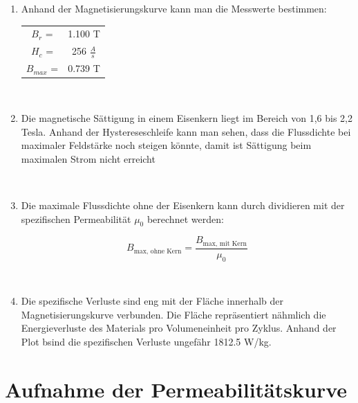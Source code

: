\documentclass[a4paper,twoside,12pt,DIV=13,BCOR=5mm,numbers=noenddot,cleardoublepage=empty]{scrbook}
\begin{document}
\begin{enumerate}
            \\
            
            \item Anhand der Magnetisierungskurve kann man die Messwerte bestimmen: \\
            \begin{tabular}{cc}
                $B_r$ =& 1.100 T  \\
                $H_c$ =& 256 $\frac{A}{s}$ \\
                $B_{max}$ =& 0.739 T

            \end{tabular}
            
            \\
            
            \item Die magnetische Sättigung in einem Eisenkern  liegt im Bereich von 1,6 bis 2,2 Tesla. Anhand der Hystereseschleife kann man sehen, dass die Flussdichte bei maximaler Feldstärke noch steigen könnte, damit ist Sättigung beim maximalen Strom nicht erreicht

            \\
            
            \item Die maximale Flussdichte ohne der Eisenkern kann durch dividieren mit der spezifischen Permeabilität $\mu_0$ berechnet werden:

                \begin{equation}
                B_{\text{max, ohne Kern}} = \frac{B_{\text{max, mit Kern}}}{\mu_0}
                \end{equation}
    
            \\
            
            \item Die spezifische Verluste sind eng mit der Fläche innerhalb der Magnetisierungskurve verbunden. Die Fläche repräsentiert nähmlich die Energieverluste des Materials pro Volumeneinheit pro Zyklus. Anhand der Plot bsind die spezifischen Verluste ungefähr 1812.5 W/kg.
        
        \end{enumerate}
\section{Aufnahme der Permeabilit\"atskurve}
\end{document}
